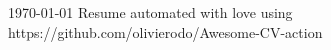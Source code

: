 \documentclass[11pt, a4paper]{awesome-cv}
\begin{document}
\makecvheader[C]

\makecvfooter
  {\today}
  {Resume automated with love using https://github.com/olivierodo/Awesome-CV-action}
  {\thepage}







\end{document}
